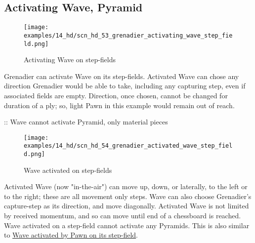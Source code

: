 \clearpage %

\subsection*{Activating Wave, Pyramid}
\label{sec:Hemera's Dawn/Grenadier/Activating Wave, Pyramid}

\vspace*{-1.4\baselineskip}
\noindent
\begin{figure}[!h]
\texttt{[image: examples/14\_hd/scn\_hd\_53\_grenadier\_activating\_wave\_step\_field.png]}
\vspace*{-1.4\baselineskip}
\caption{Activating Wave on step-fields}
\label{fig:scn_hd_53_grenadier_activating_wave_step_field}
\end{figure}

\vspace*{-0.5\baselineskip}
Grenadier can activate Wave on its step-fields. Activated Wave can chose any
direction Grenadier would be able to take, including any capturing step, even if
associated fields are empty.\newline
\indent
Direction, once chosen, cannot be changed for duration of a ply; so, light Pawn
in this example would remain out of reach.

\TODO :: Wave cannot activate Pyramid, only material pieces

\clearpage %

\vspace*{-2.1\baselineskip}
\noindent
\begin{figure}[!h]
\texttt{[image: examples/14\_hd/scn\_hd\_54\_grenadier\_activated\_wave\_step\_field.png]}
\vspace*{-1.4\baselineskip}
\caption{Wave activated on step-fields}
\label{fig:scn_hd_54_grenadier_activated_wave_step_field}
\end{figure}

\vspace*{-0.5\baselineskip}
Activated Wave (now "in-the-air") can move up, down, or laterally, to the left or
to the right; these are all movement only steps. Wave can also choose Grenadier’s
capture-step as its direction, and move diagonally.\newline
\indent
Activated Wave is not limited by received momentum, and so can move until end of
a chessboard is reached. Wave activated on a step-field cannot activate any Pyramids.\newline
\indent
This is also similar to
\hyperref[fig:scn_n_19_sideways_pawn_activated_wave]{Wave activated by Pawn on its step-field}.

